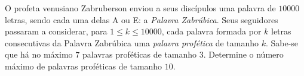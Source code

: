 O profeta venusiano Zabruberson enviou a seus discípulos uma palavra de $10000$ letras, sendo cada uma delas A ou E: a \textit{Palavra Zabrúbica}.
Seus seguidores passaram a considerar, para $1 \le k \le 10000$, cada palavra formada por $k$ letras consecutivas da Palavra Zabrúbica uma \textit{palavra profética} de tamanho $k$.
Sabe-se que há no máximo $7$ palavras proféticas de tamanho $3$.
Determine o número máximo de palavras proféticas de tamanho $10$.